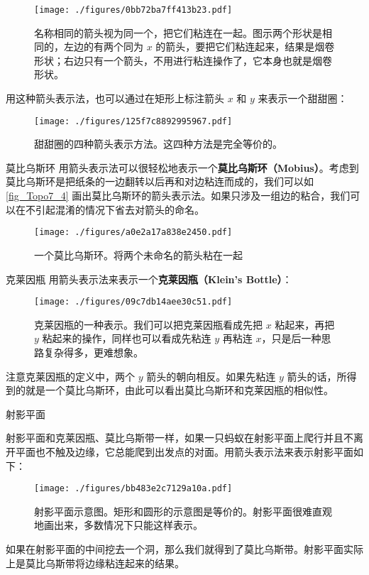 \begin{figure}[ht]
\centering
\texttt{[image: ./figures/0bb72ba7ff413b23.pdf]}
\caption{名称相同的箭头视为同一个，把它们粘连在一起。图示两个形状是相同的，左边的有两个同为 $x$ 的箭头，要把它们粘连起来，结果是烟卷形状；右边只有一个箭头，不用进行粘连操作了，它本身也就是烟卷形状。} \label{fig_Topo7_2}
\end{figure}

用这种箭头表示法，也可以通过在矩形上标注箭头 $x$ 和 $y$ 来表示一个甜甜圈：

\begin{figure}[ht]
\centering
\texttt{[image: ./figures/125f7c8892995967.pdf]}
\caption{甜甜圈的四种箭头表示方法。这四种方法是完全等价的。} \label{fig_Topo7_3}
\end{figure}

\begin{example}{莫比乌斯环}
用箭头表示法可以很轻松地表示一个\textbf{莫比乌斯环（Mobius）}。考虑到莫比乌斯环是把纸条的一边翻转以后再和对边粘连而成的，我们可以如\autoref{fig_Topo7_4} 画出莫比乌斯环的箭头表示法。如果只涉及一组边的粘合，我们可以在不引起混淆的情况下省去对箭头的命名。

\begin{figure}[ht]
\centering
\texttt{[image: ./figures/a0e2a17a838e2450.pdf]}
\caption{一个莫比乌斯环。将两个未命名的箭头粘在一起} \label{fig_Topo7_4}
\end{figure}

\end{example}



\begin{example}{克莱因瓶}
用箭头表示法来表示一个\textbf{克莱因瓶（Klein's Bottle）}：
\begin{figure}[ht]
\centering
\texttt{[image: ./figures/09c7db14aee30c51.pdf]}
\caption{克莱因瓶的一种表示。我们可以把克莱因瓶看成先把 $x$ 粘起来，再把 $y$ 粘起来的操作，同样也可以看成先粘连 $y$ 再粘连 $x$，只是后一种思路复杂得多，更难想象。} \label{fig_Topo7_5}
\end{figure}

注意克莱因瓶的定义中，两个 $y$ 箭头的朝向相反。如果先粘连 $y$ 箭头的话，所得到的就是一个莫比乌斯环，由此可以看出莫比乌斯环和克莱因瓶的相似性。

\end{example}

\begin{example}{射影平面}

射影平面和克莱因瓶、莫比乌斯带一样，如果一只蚂蚁在射影平面上爬行并且不离开平面也不触及边缘，它总能爬到出发点的对面。用箭头表示法来表示射影平面如下：

\begin{figure}[ht]
\centering
\texttt{[image: ./figures/bb483e2c7129a10a.pdf]}
\caption{射影平面示意图。矩形和圆形的示意图是等价的。射影平面很难直观地画出来，多数情况下只能这样表示。} \label{fig_Topo7_8}
\end{figure}

如果在射影平面的中间挖去一个洞，那么我们就得到了莫比乌斯带。射影平面实际上是莫比乌斯带将边缘粘连起来的结果。

\end{example}

